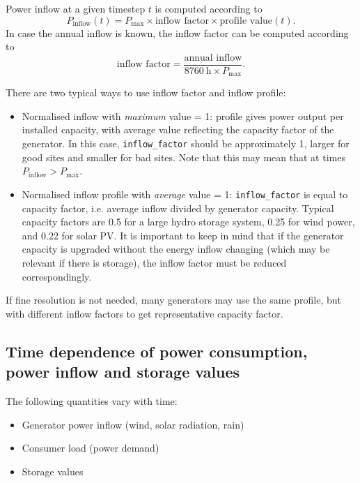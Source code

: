 \documentclass{article}
\begin{document}
Power inflow at a given timestep $t$ is computed according to
\begin{equation}
	\label{eq:inflow}
	 P_\text{inflow}(t) =  P_\text{max} \times \text{inflow factor} \times \text{profile value}(t) .
\end{equation}
%
In case the annual inflow is known, the inflow factor can be computed according to
\begin{equation}
	\label{eq:inflow_annual}
	 \text{inflow factor} = \frac{\text{annual inflow}}{8760~\text{h} \times P_\text{max}}.
\end{equation}
%

There are two typical ways to use inflow factor and inflow profile:
\begin{itemize}
\item Normalised inflow with \emph{maximum} value = 1: profile gives power output per installed capacity, with average value reflecting the capacity factor of the generator. 
In this case, \texttt{inflow\_factor} should be approximately 1, larger for good sites and smaller for bad sites.  Note that this may mean that at times $ P_\text{inflow}>P_\text{max}$.
\item Normalised inflow profile with \emph{average} value = 1:  \texttt{inflow\_factor} is equal to capacity factor, i.e. average inflow divided by generator capacity. Typical capacity factors are  0.5 for a large hydro storage system, 0.25 for wind power, and 0.22 for solar PV.
It is important to keep in mind that if the generator capacity is upgraded without the energy inflow changing (which may be relevant if there is storage), the inflow factor must be reduced correspondingly. 
\end{itemize}
%
If fine resolution is not needed, many generators may use the same profile, but with different inflow factors to get representative capacity factor.

\subsection{Time dependence of power consumption, power inflow and storage values}
The following quantities vary with time:
\begin{itemize}
\item Generator power inflow (wind, solar radiation, rain)
\item Consumer load (power demand)
\item Storage values
\end{itemize}
\end{document}
